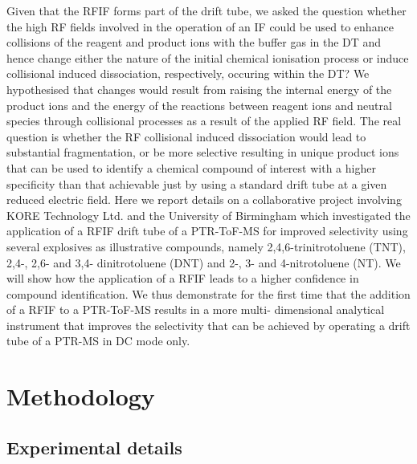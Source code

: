 Given that the RFIF forms part of the drift tube, we asked the question whether the high RF fields involved in the operation of an IF could be used to enhance collisions of the reagent and product ions with the buffer gas in the DT and hence change either the nature of the initial chemical ionisation process or induce collisional induced dissociation, respectively, occuring within the DT? We hypothesised that changes would result from raising the internal energy of the product ions and the energy of the reactions between reagent ions and neutral species through collisional processes as a result of the applied RF field. The real question is whether the RF collisional induced dissociation would lead to substantial fragmentation, or be more selective resulting in unique product ions that can be used to identify a chemical compound of interest with a higher specificity than that achievable just by using a standard drift tube at a given reduced electric field. Here we report details on a collaborative project involving KORE Technology Ltd. and the University of Birmingham which investigated the application of a RFIF drift tube of a PTR-ToF-MS for improved selectivity using several explosives as illustrative compounds, namely 2,4,6-trinitrotoluene (TNT), 2,4-, 2,6- and 3,4- dinitrotoluene (DNT) and 2-, 3- and 4-nitrotoluene (NT). We will show how the application of a RFIF leads to a higher confidence in compound identification. We thus demonstrate for the first time that the addition of a RFIF to a PTR-ToF-MS results in a more multi- dimensional analytical instrument that improves the selectivity that can be achieved by operating a drift tube of a PTR-MS in DC mode only.





\section{Methodology}

\subsection{Experimental details}

